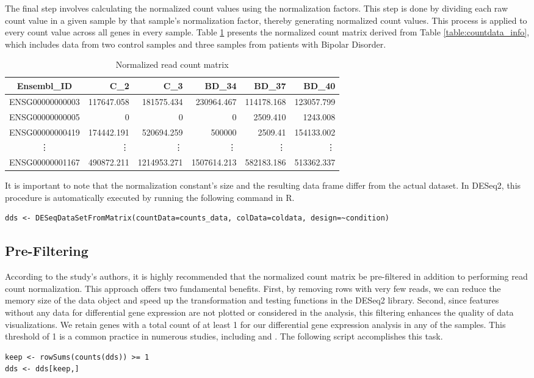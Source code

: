 \documentclass{article}
\begin{document}
The final step involves calculating the normalized count values using the normalization factors. This step is done by dividing each raw count value in a given sample by that sample's normalization factor, thereby generating normalized count values. This process is applied to every count value across all genes in every sample. Table \ref{table:normalized_countdata} presents the normalized count matrix derived from Table \ref{table:countdata_info}, which includes data from two control samples and three samples from patients with Bipolar Disorder.
\begin{table}[H]
\centering
\begin{tabular}{crrrrr}
\toprule
Ensembl\_ID & C\_2 & C\_3 & BD\_34 & BD\_37 & BD\_40 \\
\midrule
ENSG00000000003 & 117647.058 & 181575.434 & 230964.467 & 114178.168 & 123057.799 \\
ENSG00000000005 & 0 & 0 & 0 & 2509.410 & 1243.008 \\
ENSG00000000419 & 174442.191 & 520694.259 & 500000 & 2509.41 & 154133.002 \\
\vdots & \vdots & \vdots & \vdots & \vdots & \vdots \\
ENSG00000001167 & 490872.211 & 1214953.271 & 1507614.213 & 582183.186 & 513362.337 \\
\bottomrule
\end{tabular}
\caption{Normalized read count matrix}
\label{table:normalized_countdata}
\end{table}
It is important to note that the normalization constant's size and the resulting data frame differ from the actual dataset. In DESeq2, this procedure is automatically executed by running the following command in R.
\begin{verbatim}
dds <- DESeqDataSetFromMatrix(countData=counts_data, colData=coldata, design=~condition)
\end{verbatim}

\subsection{Pre-Filtering}
According to the study's authors, it is highly recommended that the normalized count matrix be pre-filtered in addition to performing read count normalization. This approach offers two fundamental benefits. First, by removing rows with very few reads, we can reduce the memory size of the data object and speed up the transformation and testing functions in the DESeq2 library. Second, since features without any data for differential gene expression are not plotted or considered in the analysis, this filtering enhances the quality of data visualizations. We retain genes with a total count of at least 1 for our differential gene expression analysis in any of the samples. This threshold of 1 is a common practice in numerous studies, including \cite{nance2022transcriptomic} and \cite{pacifico2017transcriptome}. The following script accomplishes this task.
\begin{verbatim}
keep <- rowSums(counts(dds)) >= 1
dds <- dds[keep,]
\end{verbatim}
\end{document}
